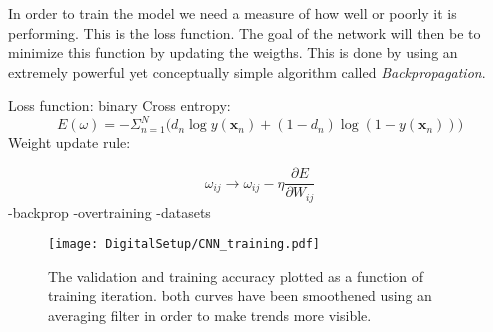\documentclass[main.tex]{subfiles}
\begin{document}
In order to train the model we need a measure of how well or poorly it is performing. This is the loss function. The goal of the network will then be to minimize this function by updating the weigths. This is done by using an extremely powerful yet conceptually simple algorithm called \textit{Backpropagation}.

Loss function: binary Cross entropy: 
\begin{equation}
E(\omega) = -\Sigma_{n=1}^N \Big(d_n\log y(\mathbf x_n) + (1 - d_n)\log(1-y(\mathbf x_n))\Big)
\end{equation}
Weight update rule:

\begin{equation}
\omega_{ij} \rightarrow \omega_{ij} - \eta\frac{\partial E}{\partial W_{ij}}
\end{equation}
-backprop
-overtraining
-datasets

\label{sec:cnn}
\begin{figure}[ht!]
    \centering
        \texttt{[image: DigitalSetup/CNN\_training.pdf]}
        \caption{The validation and training accuracy plotted as a function of training iteration. both curves have been smoothened using an averaging filter in order to make trends more visible.}
    \label{fig:CNN_training} 
\end{figure}
\end{document}
